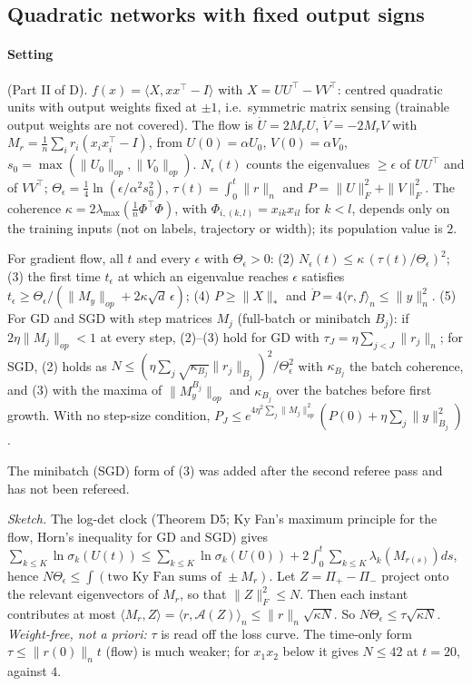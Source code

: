 \subsection{Quadratic networks with fixed output signs}\label{app:networks:quad}

\paragraph{Setting} (Part II of D). $f(x)=\langle X,xx^\top-I\rangle$ with $X=UU^\top-VV^\top$: centred quadratic units with output weights fixed at $\pm1$, i.e.\ symmetric matrix sensing (trainable output weights are not covered). The flow is $\dot U=2M_rU$, $\dot V=-2M_rV$ with $M_r=\frac1n\sum_ir_i(x_ix_i^\top-I)$, from $U(0)=\alpha U_0$, $V(0)=\alpha V_0$, $s_0=\max(\|U_0\|_{op},\|V_0\|_{op})$. $N_\epsilon(t)$ counts the eigenvalues $\ge\epsilon$ of $UU^\top$ and of $VV^\top$; $\Theta_\epsilon=\frac14\ln(\epsilon/\alpha^2s_0^2)$, $\tau(t)=\int_0^t\|r\|_n$ and $P=\|U\|_F^2+\|V\|_F^2$. The coherence $\kappa=2\lambda_{\max}(\frac1n\Phi^\top\Phi)$, with $\Phi_{i,(k,l)}=x_{ik}x_{il}$ for $k<l$, depends only on the training inputs (not on labels, trajectory or width); its population value is $2$.

\begin{theorem}\label{thm:D6}
For gradient flow, all $t$ and every $\epsilon$ with $\Theta_\epsilon>0$:
(2) $N_\epsilon(t)\le\kappa\,(\tau(t)/\Theta_\epsilon)^2$;
(3) the first time $t_\epsilon$ at which an eigenvalue reaches $\epsilon$ satisfies $t_\epsilon\ge\Theta_\epsilon/(\|M_y\|_{op}+2\kappa\sqrt d\,\epsilon)$;
(4) $P\ge\|X\|_*$ and $\dot P=4\langle r,f\rangle_n\le\|y\|_n^2$.
(5) For GD and SGD with step matrices $M_j$ (full-batch or minibatch $B_j$): if $2\eta\|M_j\|_{op}<1$ at every step, (2)--(3) hold for GD with $\tau_J=\eta\sum_{j<J}\|r_j\|_n$; for SGD, (2) holds as $N\le(\eta\sum_j\sqrt{\kappa_{B_j}}\|r_j\|_{B_j})^2/\Theta_\epsilon^2$ with $\kappa_{B_j}$ the batch coherence, and (3) with the maxima of $\|M^{B_j}_y\|_{op}$ and $\kappa_{B_j}$ over the batches before first growth. With no step-size condition, $P_J\le e^{4\eta^2\sum_j\|M_j\|_{op}^2}(P(0)+\eta\sum_j\|y\|_{B_j}^2)$.
\end{theorem}
\noindent The minibatch (SGD) form of (3) was added after the second referee pass and has not been refereed.

\noindent\emph{Sketch.} The log-det clock (Theorem D5; Ky Fan's maximum principle for the flow, Horn's inequality for GD and SGD) gives $\sum_{k\le K}\ln\sigma_k(U(t))\le\sum_{k\le K}\ln\sigma_k(U(0))+2\int_0^t\sum_{k\le K}\lambda_k(M_{r(s)})ds$, hence $N\Theta_\epsilon\le\int(\text{two Ky Fan sums of }\pm M_r)$. Let $Z=\Pi_+-\Pi_-$ project onto the relevant eigenvectors of $M_r$, so that $\|Z\|_F^2\le N$. Then each instant contributes at most $\langle M_r,Z\rangle=\langle r,\mathcal A(Z)\rangle_n\le\|r\|_n\sqrt{\kappa N}$. So $N\Theta_\epsilon\le\tau\sqrt{\kappa N}$.
\emph{Weight-free, not a priori:} $\tau$ is read off the loss curve. The time-only form $\tau\le\|r(0)\|_nt$ (flow) is much weaker; for $x_1x_2$ below it gives $N\le42$ at $t=20$, against $4$.

